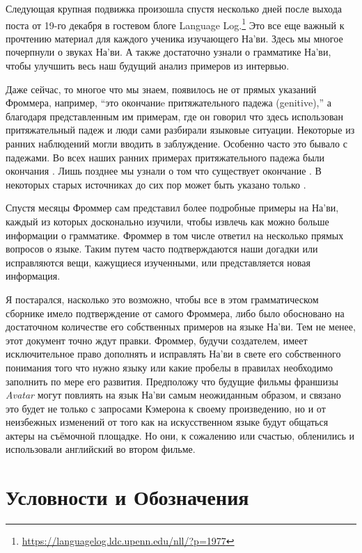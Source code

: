Следующая крупная подвижка произошла спустя несколько дней после
выхода поста от 19-го декабря в гостевом блоге Language
Log.\footnote{\url{https://languagelog.ldc.upenn.edu/nll/?p=1977}}
Это все еще важный к прочтению материал для каждого ученика
изучающего На'ви. Здесь мы многое почерпнули о звуках На'ви. А
также
достаточно узнали о грамматике На’ви, чтобы улучшить весь наш
будущий анализ
примеров из интервью.

Даже сейчас, то многое что мы знаем, появилось не от прямых
указаний Фроммера, например, ``это окончаниe притяжательного
падежа (genitive),'' а благодаря представленным им примерам, где
он говорил что здесь использован притяжательный падеж и люди
сами разбирали языковые ситуации. Некоторые из ранних наблюдений
могли вводить в заблуждение. Особенно часто это бывало с
падежами. Во всех наших ранних примерах притяжательного падежа
были окончания . Лишь позднее мы узнали о том что
существует окончание . В некоторых старых источниках до
сих пор может быть указано только
.

Спустя месяцы Фроммер сам представил более подробные примеры на
На'ви, каждый из которых досконально изучили, чтобы извлечь как
можно больше информации о грамматике. Фроммер в том числе
ответил на несколько прямых вопросов о языке. Таким путем часто
подтверждаются наши догадки или исправляются вещи, кажущиеся
изученными, или представляется новая информация.

Я постарался, насколько это возможно, чтобы все в этом
грамматическом сборнике имело подтверждение от самого Фроммера,
либо было обосновано на достаточном количестве его собственных
примеров на языке На'ви. Тем не менее, этот документ точно ждут
правки. Фроммер, будучи создателем, имеет исключительное право
дополнять и исправлять На'ви в свете его собственного понимания
того что нужно языку или какие пробелы в правилах необходимо
заполнить по мере его развития.
Предположу что будущие фильмы франшизы \textit{Avatar} могут
повлиять на язык На'ви самым неожиданным образом, и связано это
будет не только с запросами Кэмерона к своему произведению, но и
от неизбежных изменений от того как на искусственном языке будут
общаться актеры на съёмочной площадке. Но они, к сожалению или
счастью, обленились и использовали английский во втором фильме.


\section{Условности и Обозначения}

